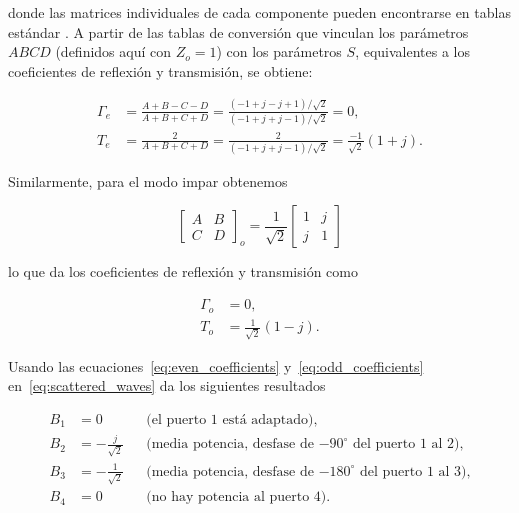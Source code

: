 donde las matrices individuales de cada componente pueden encontrarse en tablas estándar \cite{pozar2011}. A partir de las tablas de conversión que vinculan los parámetros $ABCD$ (definidos aquí con $Z_o = 1$) con los parámetros $S$, equivalentes a los coeficientes de reflexión y transmisión, se obtiene:

\begin{subequations}
    \begin{align}
        \Gamma_e &= \frac{A+B-C-D}{A+B+C+D} = \frac{(-1+j-j+1)/\sqrt{2}}{(-1+j+j-1)/\sqrt{2}} = 0, \\
        T_e &= \frac{2}{A+B+C+D} = \frac{2}{(-1+j+j-1)/\sqrt{2}} = \frac{-1}{\sqrt{2}}(1+j).
    \end{align}
    \label{eq:even_coefficients}
\end{subequations}

Similarmente, para el modo impar obtenemos

\begin{equation}
    \begin{bmatrix} 
        A & B \\ 
        C & D 
    \end{bmatrix}_{\!o} 
    = \frac{1}{\sqrt{2}} 
    \begin{bmatrix} 
        1 & j \\ 
        j & 1 
    \end{bmatrix}
    \label{eq:abcd_odd}
\end{equation}

lo que da los coeficientes de reflexión y transmisión como

\begin{subequations}
    \begin{align}
        \Gamma_o &= 0, \\
        T_o &= \frac{1}{\sqrt{2}}(1-j).
    \end{align}
    \label{eq:odd_coefficients}
\end{subequations}

Usando las ecuaciones~\eqref{eq:even_coefficients} y~\eqref{eq:odd_coefficients} en~\eqref{eq:scattered_waves} da los siguientes resultados

\begin{subequations}
    \begin{align}
        B_1 &= 0 && \text{(el puerto 1 está adaptado),} \\
        B_2 &= -\frac{j}{\sqrt{2}} && \text{(media potencia, desfase de $-90^{\circ}$ del puerto 1 al 2),} \\
        B_3 &= -\frac{1}{\sqrt{2}} && \text{(media potencia, desfase de $-180^{\circ}$ del puerto 1 al 3),} \\
        B_4 &= 0 && \text{(no hay potencia al puerto 4).}
    \end{align}
    \label{eq:final_results}
\end{subequations}

